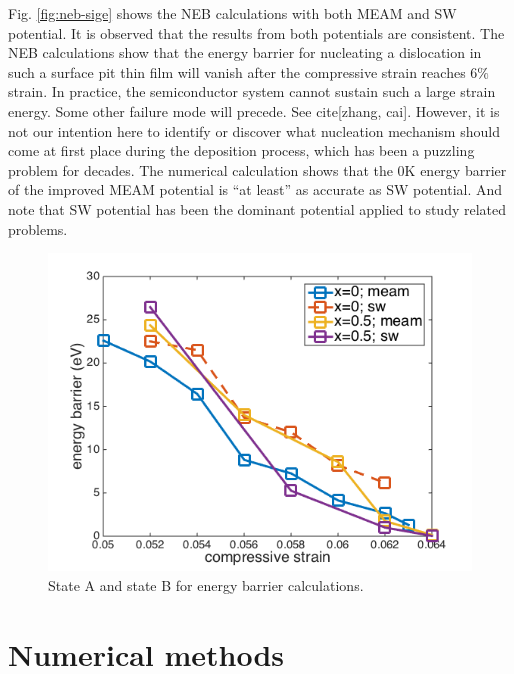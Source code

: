 \documentclass[review]{elsarticle}
\begin{document}

Fig. \ref{fig:neb-sige} shows the NEB calculations with both MEAM and SW potential. It is observed that the results from both potentials are consistent. The NEB calculations show that the energy barrier for nucleating a dislocation in such a surface pit thin film will vanish after the compressive strain reaches $6\%$ strain. In practice, the semiconductor system cannot sustain such a large strain energy. Some other failure mode will precede. See cite[zhang, cai]. However, it is not our intention here to identify or discover what nucleation mechanism should come at first place during the deposition process, which has been a puzzling problem for decades. The numerical calculation shows that the 0K energy barrier of the improved MEAM potential is ``at least'' as accurate as SW potential. And note that SW potential has been the dominant potential applied to study related problems. 

\begin{figure}[H]
\centering
\includegraphics[width=.5\linewidth]{Figures/neb_plot_sige.png}
\caption{State A and state B for energy barrier calculations.}
\label{fig:energy_barrier}
\end{figure}



\section{Numerical methods}
\end{document}
